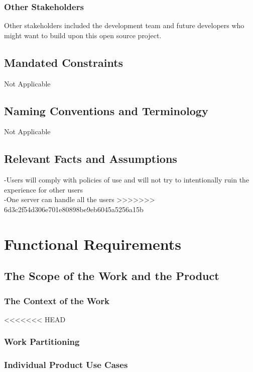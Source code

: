 \documentclass[12pt, titlepage]{article}
\begin{document}
    		\subsubsection{Other Stakeholders}
    		 Other stakeholders included the development team and future developers who might want to build upon this open source project.

    	\subsection{Mandated Constraints}
    Not Applicable
    	\subsection{Naming Conventions and Terminology}
Not Applicable
    	\subsection{Relevant Facts and Assumptions}

    	-Users will comply with policies of use and will not try to intentionally ruin the experience for other users\\
    	-One server can handle all the users
>>>>>>> 6d3c2f54d306e701e80898be9eb6045a5256a15b
	
	\newpage
    \section{Functional Requirements}

    	\subsection{The Scope of the Work and the Product}

    		\subsubsection{The Context of the Work}
<<<<<<< HEAD

    		\subsubsection{Work Partitioning}

    		\subsubsection{Individual Product Use Cases}
\end{document}

